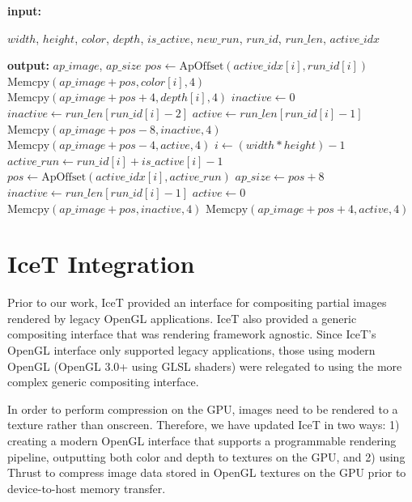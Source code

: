 \documentclass{vgtc}                          %
\makeatletter
\newcommand{\setalglineno}[1]{%
  \setcounter{ALG@line}{\numexpr#1-1}}
\makeatother
\begin{document}
\begin{algorithm}[th!]
\begin{algorithmic}[1]
\item[]
\setalglineno{1}
  \Statex \textbf{input:} \parbox[t]{175pt}{$width$, $height$, $color$, $depth$, $is\_active$, $new\_run$, $run\_id$, $run\_len$, $active\_idx$\strut}
  \Statex \textbf{output:} $ap\_image$, $ap\_size$
      \State $pos \gets \text{ApOffset}(active\_idx[i], run\_id[i])$
      \State $\text{Memcpy}(ap\_image + pos, color[i], 4)$
      \State $\text{Memcpy}(ap\_image + pos + 4, depth[i], 4)$
        \State $inactive \gets 0$
          \State $inactive \gets run\_len[run\_id[i] - 2]$
        \EndIf
        \State $active \gets run\_len[run\_id[i] - 1]$
        \State $\text{Memcpy}(ap\_image + pos - 8, inactive, 4)$
        \State $\text{Memcpy}(ap\_image + pos - 4, active, 4)$
      \EndIf
    \EndIf
  \EndParFor
  \State $i \gets (width * height) - 1$
  \State $active\_run \gets run\_id[i] + is\_active[i] - 1$
  \State $pos \gets \text{ApOffset}(active\_idx[i], active\_run)$
  \State $ap\_size \gets pos + 8$
    \State $inactive \gets run\_len[run\_id[i] - 1]$
    \State $active \gets 0$
    \State $\text{Memcpy}(ap\_image + pos, inactive, 4)$
    \State $\text{Memcpy}(ap\_image + pos + 4, active, 4)$
  \EndIf
\EndProcedure
\end{algorithmic}
\end{algorithm}

\setlength{\textfloatsep}{\textfloatsepsave}

\section{IceT Integration}
Prior to our work, IceT provided an interface for compositing partial images rendered by legacy OpenGL applications. IceT also provided a generic compositing interface that was rendering framework agnostic. Since IceT's OpenGL interface only supported legacy applications, those using modern OpenGL (OpenGL 3.0+ using GLSL shaders) were relegated to using the more complex generic compositing interface. 

In order to perform compression on the GPU, images need to be rendered to a texture rather than onscreen. Therefore, we have updated IceT in two ways: 1) creating a modern OpenGL interface that supports a programmable rendering pipeline, outputting both color and depth to textures on the GPU, and 2) using Thrust to compress image data stored in OpenGL textures on the GPU prior to device-to-host memory transfer.
\end{document}
